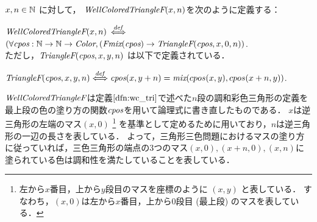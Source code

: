 \begin{dfn}[$\WCTF$]\rm
  $x, n \in \mathbb{N}$ に対して，
  $\textit{WellColoredTriangleF}(x, n)$を次のように定義する：
  
  $\textit{WellColoredTriangleF}(x, n)$ $\overset{{\it def}}{\Longleftrightarrow}$ $(\forall \textit{cpos}: \mathbb{N} \to \mathbb{N} \to \textit{Color}, (\textit{Fmix}(\textit{cpos}) \to \textit{TriangleF}(\textit{cpos},x,0,n))$. \\
  
  ただし，$\textit{TriangleF}(\textit{cpos},x,y,n)$ は以下で定義されている．

  $\textit{TriangleF}(\textit{cpos},x,y,n) \overset{{\it def}}{\Longleftrightarrow}
  \textit{cpos}(x,y+n) = \textit{mix}(cpos(x,y),cpos(x+n,y))$.

  $\WCTF$は定義$\ref{dfn:wc_tri}$で述べた$n$段の調和彩色三角形の定義を最上段の色の塗り方の関数$\textit{cpos}$を用いて論理式に書き直したものである．
  $x$は逆三角形の左端のマス$(x,0)$
  \footnote
      {
        左から$x$番目，上から$y$段目のマスを座標のように $(x,y)$ と表している．
        すなわち，$(x,0)$は左から$x$番目，上から$0$段目 (最上段) のマスを表している．
      }
  を基準として定めるために用いており，$n$は逆三角形の一辺の長さを表している．
  よって，三角形三色問題におけるマスの塗り方に従っていれば，三色三角形の端点の$3$つのマス$(x,0), (x+n,0), (x,n)$に塗られている色は調和性を満たしていることを表している．
\end{dfn}

